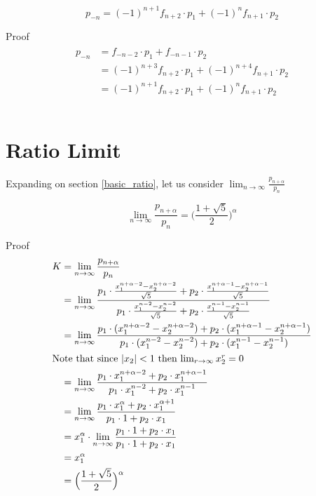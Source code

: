 \documentclass[a4paper]{article}
\begin{document}
\begin{theorem}
$$
p_{-n} = (-1)^{n+1} f_{n+2} \cdot p_1 + (-1)^{n}f_{n+1} \cdot p_2 
$$

Proof
\begin{gather*}
\begin{split}
p_{-n} &= f_{-n-2} \cdot p_1 + f_{-n-1} \cdot p_2 \\
    &= (-1)^{n+3} f_{n+2} \cdot p_1 + (-1)^{n+4} f_{n+1} \cdot p_2 \\
    &= (-1)^{n+1} f_{n+2} \cdot p_1 + (-1)^{n} f_{n+1} \cdot p_2 \\
\end{split}\\
\end{gather*}
\end{theorem}

\section{Ratio Limit}
Expanding on section \ref{basic_ratio}, let us consider $\lim_{n \to \infty} \frac{p_{n+\alpha}}{p_n}$

\begin{theorem}
$$
\lim_{n \to \infty} \frac{p_{n+\alpha}}{p_n} = \Big(\frac{1+\sqrt{5}}{2}\Big)^{\alpha}
$$

Proof
\begin{gather*}
\begin{split}
K &= \lim_{n \to \infty} \frac{p_{n+\alpha}}{p_n} \\
    &= \lim_{n \to \infty} \frac{    
p_1 \cdot \frac{x_1^{n+ \alpha -2} - x_2^{n+\alpha -2}}{\sqrt{5}} + p_2 \cdot \frac{x_1^{n+\alpha-1} - x_2^{n+\alpha-1}}{\sqrt{5}}
    }{
p_1 \cdot \frac{x_1^{n-2} - x_2^{n -2}}{\sqrt{5}} + p_2 \cdot \frac{x_1^{n-1} - x_2^{n-1}}{\sqrt{5}}
    } \\
    &= \lim_{n \to \infty} \frac{    
p_1 \cdot (x_1^{n+ \alpha -2} - x_2^{n+\alpha -2} ) + p_2 \cdot (x_1^{n+\alpha-1} - x_2^{n+\alpha-1})
    }{
p_1 \cdot (x_1^{n-2} - x_2^{n -2}) + p_2 \cdot (x_1^{n-1} - x_2^{n-1})
    }\\
\shortintertext{Note that since $|x_2| <1$ then $\lim_{r \to \infty} x_2^r = 0$ }
    &= \lim_{n \to \infty} \frac{    
p_1 \cdot x_1^{n+ \alpha -2} + p_2 \cdot x_1^{n+\alpha-1}
    }{
p_1 \cdot x_1^{n-2} + p_2 \cdot x_1^{n-1}
    } \\
    &= \lim_{n \to \infty} \frac{    
p_1 \cdot x_1^{\alpha} + p_2 \cdot x_1^{\alpha+1}
    }{
p_1 \cdot 1 + p_2 \cdot x_1
    } \\
    &= x_1^{\alpha} \cdot \lim_{n \to \infty} \frac{    
p_1 \cdot 1 + p_2 \cdot x_1
    }{
p_1 \cdot 1 + p_2 \cdot x_1
    } \\
    &=  x_1^{\alpha} \\
    &= \Big(\frac{1+\sqrt{5}}{2}\Big)^{\alpha} \\
\end{split}\\
\end{gather*}
\end{theorem}
\end{document}
